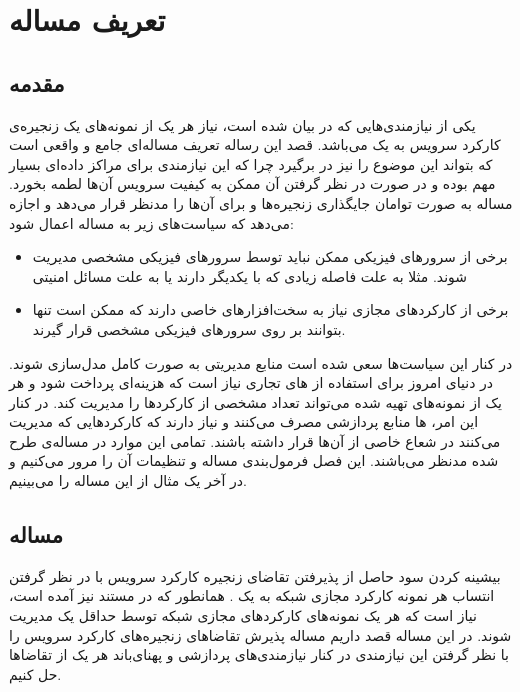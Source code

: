 \chapter{تعریف مساله}

\section{مقدمه}
یکی از نیازمندی‌هایی که در \cite{ETSI-MAN} بیان شده است،
نیاز هر یک از نمونه‌های یک زنجیره‌ی کارکرد سرویس به یک 
می‌باشد.
قصد این رساله تعریف مساله‌ای جامع و واقعی است که بتواند این موضوع را نیز در برگیرد
چرا که این نیازمندی برای مراکز داده‌ای بسیار مهم بوده
و در صورت در نظر گرفتن آن ممکن به کیفیت سرویس آن‌ها لطمه بخورد.
مساله به صورت توامان جایگذاری زنجیره‌ها و  برای آن‌ها را مدنظر قرار می‌دهد و
اجازه می‌دهد که سیاست‌های زیر به مساله اعمال شود:

\begin{itemize}
    \item
    برخی از سرورهای فیزیکی ممکن نباید توسط سرورهای فیزیکی مشخصی مدیریت شوند.
    مثلا به علت فاصله زیادی که با یکدیگر دارند یا به علت مسائل امنیتی
    \item
    برخی از کارکردهای مجازی نیاز به سخت‌افزارهای خاصی دارند که ممکن است تنها بتوانند
    بر روی سرورهای فیزیکی مشخصی قرار گیرند.
\end{itemize}

در کنار این سیاست‌ها سعی شده است منابع مدیریتی به صورت کامل مدل‌سازی شوند.
در دنیای امروز برای استفاده از های تجاری نیاز است
که هزینه‌ای پرداخت شود و هر یک از نمونه‌های تهیه شده می‌تواند تعداد مشخصی از کارکردها را مدیریت کند.
در کنار این امر، ها منابع پردازشی مصرف می‌کنند و
نیاز دارند که کارکردهایی که مدیریت می‌کنند در شعاع خاصی از آن‌ها قرار داشته باشند. تمامی این موارد در مساله‌ی طرح شده مدنظر می‌باشند.
این فصل فرمول‌بندی مساله و تنظیمات آن را مرور می‌کنیم و در آخر یک مثال از این مساله را می‌بینیم.
 
\section{مساله}

بیشینه کردن سود حاصل از پذیرفتن تقاضای زنجیره‌ کارکرد سرویس با در نظر گرفتن انتساب هر نمونه کارکرد مجازی شبکه به یک .
همانطور که در مستند \cite{ETSI-MAN} نیز آمده است، نیاز است که هر یک نمونه‌های کارکردهای مجازی شبکه
توسط حداقل یک  مدیریت شوند.
در این مساله قصد داریم مساله پذیرش تقاضاهای زنجیره‌های کارکرد سرویس را با نظر گرفتن این نیازمندی در کنار
نیازمندی‌های پردازشی و پهنای‌باند هر یک از تقاضاها حل کنیم.



